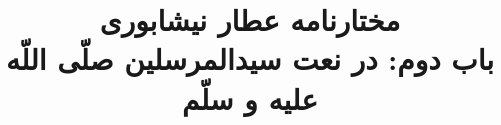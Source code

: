 \documentclass[14pt,b5paper]{article}
\begin{document}
\title{\Huge مختارنامه عطار نیشابوری \\
باب دوم: در نعت سیدالمرسلین صلّی اللّه علیه و سلّم}
\author{ }
\date{ }
\maketitle
\newpage
\tableofcontents
\newpage

\newpage

\newpage

\newpage

\newpage

\newpage

\newpage

\newpage

\newpage

\newpage

\newpage

\newpage

\newpage

\newpage
\end{document}

